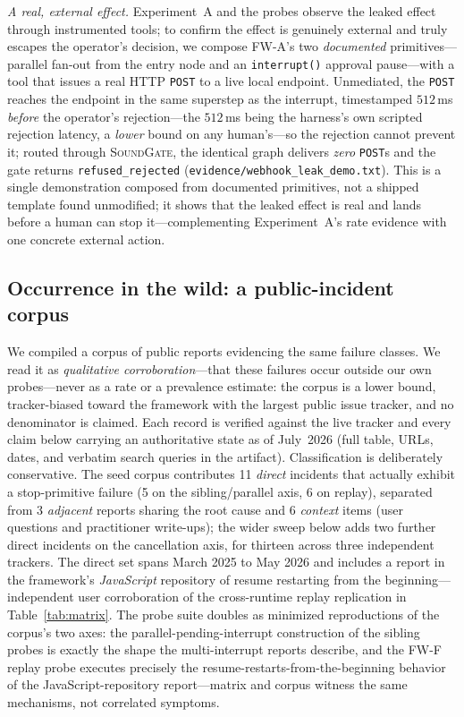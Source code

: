 \documentclass[10pt,journal,compsoc]{IEEEtran}
\newcommand{\sys}{\textsc{SoundGate}}
\begin{document}
\emph{A real, external effect.} Experiment~A and the probes observe the leaked
effect through instrumented tools; to confirm the effect is genuinely external
and truly escapes the operator's decision, we compose \textsf{FW-A}'s two
\emph{documented} primitives---parallel fan-out from the entry node and an
\texttt{interrupt()} approval pause---with a tool that issues a real HTTP
\texttt{POST} to a live local endpoint. Unmediated, the \texttt{POST} reaches
the endpoint in the same superstep as the interrupt, timestamped $512$\,ms
\emph{before} the operator's rejection---the $512$\,ms being the harness's own
scripted rejection latency, a \emph{lower} bound on any human's---so the
rejection cannot prevent it;
routed through \sys{}, the identical graph delivers \emph{zero} \texttt{POST}s
and the gate returns \texttt{refused\_rejected}
(\texttt{evidence/webhook\_leak\_demo.txt}). This is a single demonstration
composed from documented primitives, not a shipped template found unmodified;
it shows that the leaked effect is real and lands before a human can stop
it---complementing Experiment~A's rate evidence with one concrete external
action.

\subsection{Occurrence in the wild: a public-incident corpus}
\label{sec:prevalence}
We compiled a corpus of public reports evidencing the same failure classes.
We read it as \emph{qualitative corroboration}---that these failures occur
outside our own probes---never as a rate or a prevalence estimate: the corpus
is a lower bound, tracker-biased toward the framework with the largest public
issue tracker, and no denominator is claimed. Each record is verified against
the live tracker and every claim below
carrying an authoritative state as of July~2026 (full table, URLs, dates, and
verbatim search queries in the artifact). Classification is deliberately
conservative. The seed corpus contributes 11 \emph{direct} incidents that
actually exhibit a stop-primitive failure (5 on the sibling/parallel axis, 6
on replay), separated from 3 \emph{adjacent} reports sharing the root cause
and 6 \emph{context} items (user questions and practitioner write-ups); the
wider sweep below adds two further direct incidents on the cancellation axis,
for thirteen across three independent trackers. The direct set spans March 2025 to
May 2026 and includes a report in the framework's \emph{JavaScript} repository
of resume restarting from the beginning---independent user corroboration of the
cross-runtime replay replication in Table~\ref{tab:matrix}. The probe
suite doubles as minimized reproductions of the corpus's two axes: the
parallel-pending-interrupt construction of the sibling probes is exactly the
shape the multi-interrupt reports describe, and the \textsf{FW-F} replay
probe executes precisely the resume-restarts-from-the-beginning behavior of
the JavaScript-repository report---matrix and corpus witness the same
mechanisms, not correlated symptoms.
\end{document}
